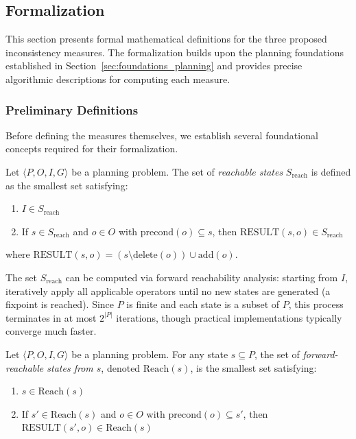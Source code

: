 \subsection{Formalization}
\label{sec:formalization}

This section presents formal mathematical definitions for the three proposed inconsistency measures. The formalization builds upon the planning foundations established in Section~\ref{sec:foundations_planning} and provides precise algorithmic descriptions for computing each measure.

\subsubsection{Preliminary Definitions}

Before defining the measures themselves, we establish several foundational concepts required for their formalization.

\begin{defn}
    Let $\langle P, O, I, G \rangle$ be a planning problem. The set of \emph{reachable states} $S_{\text{reach}}$ is defined as the smallest set satisfying:
    \begin{enumerate}
        \item $I \in S_{\text{reach}}$
        \item If $s \in S_{\text{reach}}$ and $o \in O$ with $\text{precond}(o) \subseteq s$, then $\text{RESULT}(s,o) \in S_{\text{reach}}$
    \end{enumerate}
    where $\text{RESULT}(s,o) = (s \setminus \text{delete}(o)) \cup \text{add}(o)$.
\end{defn}

The set $S_{\text{reach}}$ can be computed via forward reachability analysis: starting from $I$, iteratively apply all applicable operators until no new states are generated (a fixpoint is reached). Since $P$ is finite and each state is a subset of $P$, this process terminates in at most $2^{|P|}$ iterations, though practical implementations typically converge much faster.

\begin{defn}
    Let $\langle P, O, I, G \rangle$ be a planning problem. For any state $s \subseteq P$,
    the set of \emph{forward-reachable states from $s$}, denoted $\text{Reach}(s)$, is
    the smallest set satisfying:
    \begin{enumerate}
        \item $s \in \text{Reach}(s)$
        \item If $s' \in \text{Reach}(s)$ and $o \in O$ with $\text{precond}(o) \subseteq s'$,
              then $\text{RESULT}(s',o) \in \text{Reach}(s)$
    \end{enumerate}
\end{defn}

